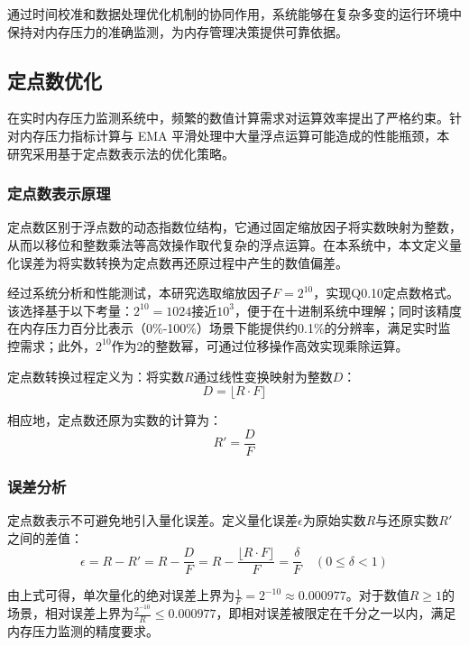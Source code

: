 通过时间校准和数据处理优化机制的协同作用，系统能够在复杂多变的运行环境中保持对内存压力的准确监测，为内存管理决策提供可靠依据。


\subsection{定点数优化}
\label{sec:fixed_point_optimization}

在实时内存压力监测系统中，频繁的数值计算需求对运算效率提出了严格约束。针对内存压力指标计算与 EMA 平滑处理中大量浮点运算可能造成的性能瓶颈，本研究采用基于定点数表示法的优化策略。

\subsubsection{定点数表示原理}

定点数区别于浮点数的动态指数位结构，它通过固定缩放因子将实数映射为整数，从而以移位和整数乘法等高效操作取代复杂的浮点运算。在本系统中，本文定义量化误差为将实数转换为定点数再还原过程中产生的数值偏差。

经过系统分析和性能测试，本研究选取缩放因子$F=2^{10}$，实现Q0.10定点数格式。该选择基于以下考量：$2^{10}=1024$接近$10^3$，便于在十进制系统中理解；同时该精度在内存压力百分比表示（0\%-100\%）场景下能提供约0.1\%的分辨率，满足实时监控需求；此外，$2^{10}$作为2的整数幂，可通过位移操作高效实现乘除运算。

定点数转换过程定义为：将实数$R$通过线性变换映射为整数$D$：
\begin{equation}
D = \lfloor R \cdot F \rfloor
\end{equation}

相应地，定点数还原为实数的计算为：
\begin{equation}
R' = \frac{D}{F}
\end{equation}

\subsubsection{误差分析}

定点数表示不可避免地引入量化误差。定义量化误差$\epsilon$为原始实数$R$与还原实数$R'$之间的差值：
\begin{equation}
\epsilon = R - R' = R - \frac{D}{F} = R - \frac{\lfloor R \cdot F \rfloor}{F} = \frac{\delta}{F} \quad (0 \leq \delta < 1)
\end{equation}

由上式可得，单次量化的绝对误差上界为$\frac{1}{F} = 2^{-10} \approx 0.000977$。对于数值$R \geq 1$的场景，相对误差上界为$\frac{2^{-10}}{R} \leq 0.000977$，即相对误差被限定在千分之一以内，满足内存压力监测的精度要求。

